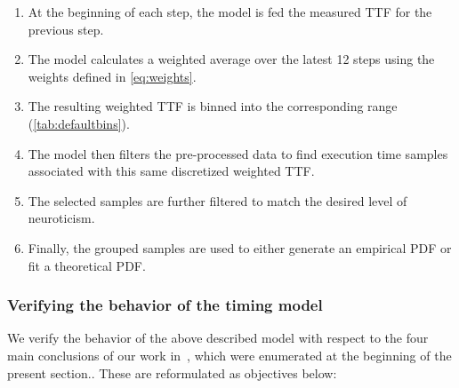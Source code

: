 \begin{enumerate}
    \item At the beginning of each step, the model is fed the measured \gls{TTF} for the previous step.
    \item The model calculates a weighted average over the latest \num{12} steps using the weights defined in \cref{eq:weights}.
    \item The resulting weighted \gls{TTF} is binned into the corresponding range (\cref{tab:defaultbins}).
    \item The model then filters the pre-processed data to find execution time samples associated with this same discretized weighted \gls{TTF}.
    \item The selected samples are further filtered to match the desired level of neuroticism.
    \item Finally, the grouped samples are used to either generate an empirical \gls{PDF} or fit a theoretical \gls{PDF}.
\end{enumerate}



\subsubsection{Verifying the behavior of the timing model}\label{ssec:model:verification}

We verify the behavior of the above described model with respect to the four main conclusions of our work in~\cite{olguinmunoz2021impact}, which were enumerated at the beginning of the present section..
These are reformulated as objectives below:

